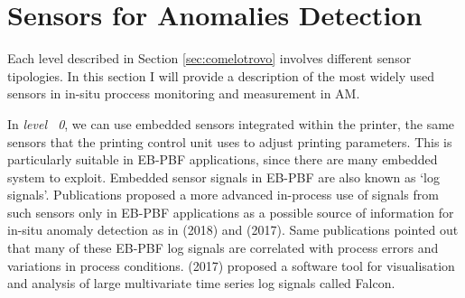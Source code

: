 
\section{Sensors for Anomalies Detection}
\label{sec:sensoriniiniini}
Each level described in Section \ref{sec:comelotrovo} involves different sensor tipologies. In this section I will provide a description of the most widely used sensors in in-situ proccess monitoring and measurement in AM. 

In \emph{level ~0}, we can use embedded sensors integrated within the printer, the same sensors that the printing control unit uses to adjust printing parameters. This is particularly suitable in EB-PBF applications, since there are many embedded system to exploit. Embedded sensor signals in EB-PBF are also known as ‘log signals’. Publications proposed a more advanced in-process use of signals from such sensors only in EB-PBF applications as a possible source of information for in-situ anomaly detection as in \citeauthor{grasso_data_2018} (2018) and \citeauthor{steed_falcon_2017} (2017). Same publications pointed out that many of these EB-PBF log signals are correlated with process errors and variations in process conditions. \citeauthor{steed_falcon_2017} (2017) proposed a software tool for visualisation and analysis of large multivariate time series log signals called Falcon. 

